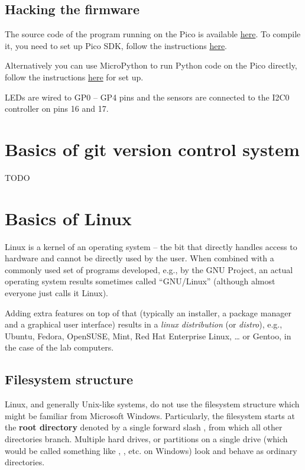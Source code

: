 \subsection{Hacking the firmware}
The source code of the program running on the Pico is available \href{https://bitbucket.org/emil_varga/picolab/src/master/}{here}. To compile it, you need to set up Pico SDK, follow the instructions \href{https://www.raspberrypi.com/documentation/microcontrollers/c_sdk.html}{here}.

Alternatively you can use MicroPython to run Python code on the Pico directly, follow the instructions \href{https://www.raspberrypi.com/documentation/microcontrollers/micropython.html#what-is-micropython}{here} for set up. 

LEDs are wired to GP0 -- GP4 pins and the sensors are connected to the I2C0 controller on pins 16 and 17.

\section{Basics of git version control system}
\label{sec:git}
TODO

\section{Basics of Linux}

Linux is a kernel of an operating system -- the bit that directly handles access to hardware and cannot be directly used by the user. When combined with a commonly used set of programs developed, e.g., by the GNU Project, an actual operating system results sometimes called
``GNU/Linux'' (although almost everyone just calls it Linux).

Adding extra features on top of that (typically an installer, a package manager and a graphical user interface) results in a \emph{linux distribution} (or \emph{distro}), e.g., Ubuntu, Fedora, OpenSUSE, Mint, Red Hat Enterprise Linux, \ldots{} or Gentoo, in the case of the lab computers.

\subsection{Filesystem structure}

Linux, and generally Unix-like systems, do not use the filesystem structure which might be familiar from Microsoft Windows. Particularly, the filesystem starts at the \textbf{root directory} denoted by a single forward slash \ls{/}, from which all other directories branch. Multiple hard drives, or partitions on a single drive (which would be called something like , , etc. on Windows) look and behave as ordinary directories.

